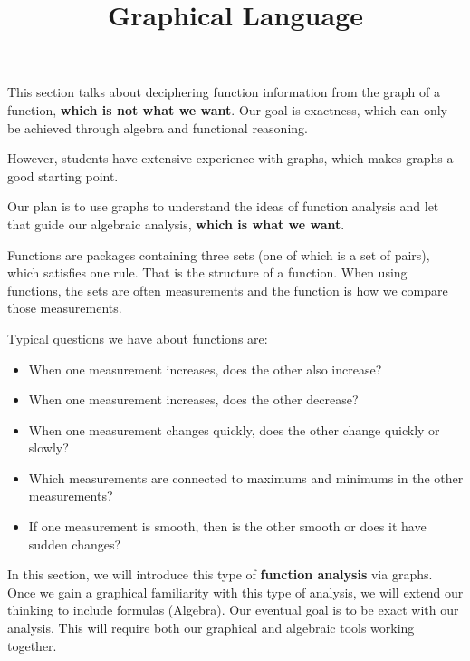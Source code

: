 \documentclass{ximera}
\title{Graphical Language}
\begin{document}
\begin{abstract}
\end{abstract}
\maketitle



\begin{warning}


This section talks about deciphering function information from the graph of a function, \textbf{\textcolor{red!70!black}{which is not what we want}}.  Our goal is exactness, which can only be achieved through algebra and functional reasoning.

However, students have extensive experience with graphs, which makes graphs a good starting point. 

Our plan is to use graphs to understand the ideas of function analysis and let that guide our algebraic analysis, \textbf{\textcolor{red!70!black}{which is what we want}}.

\end{warning}




Functions are packages containing three sets (one of which is a set of pairs), which satisfies one rule.  That is the structure of a function.  When using functions, the sets are often measurements and the function is how we compare those measurements.

Typical questions we have about functions are:

\begin{itemize}
\item When one measurement increases, does the other also increase?
\item When one measurement increases, does the other decrease?
\item When one measurement changes quickly, does the other change quickly or slowly?
\item Which measurements are connected to maximums and minimums in the other measurements?
\item If one measurement is smooth, then is the other smooth or does it have sudden changes?
\end{itemize}


In this section, we will introduce this type of \textbf{function analysis} via graphs. Once we gain a graphical familiarity with this type of analysis, we will extend our thinking to include formulas (Algebra).  Our eventual goal is to be exact with our analysis.  This will require both our graphical and algebraic tools working together.
\end{document}
